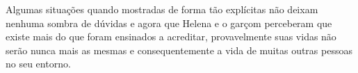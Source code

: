 Algumas situações quando mostradas de forma tão explícitas não deixam nenhuma sombra de dúvidas e agora que Helena e o garçom perceberam que existe mais do que foram ensinados a acreditar, provavelmente suas vidas não serão nunca mais as mesmas e consequentemente a vida de muitas outras pessoas no seu entorno. 



